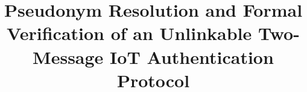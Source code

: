 \documentclass[runningheads]{llncs}
\begin{document}
\title{Pseudonym Resolution and Formal Verification of an Unlinkable Two-Message IoT Authentication Protocol}

\maketitle

\end{document}

